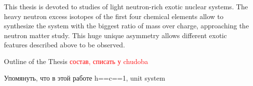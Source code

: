 This thesis is devoted to studies of light neutron-rich exotic nuclear systems.
The heavy neutron excess isotopes of the first four chemical elements allow to synthesize the system with the biggest ratio of mass over charge, approaching the neutron matter study.
This huge unique asymmetry allows different exotic features described above to be observed.

Outline of the Thesis
\textcolor{red}{состав, списать у chudoba}

Упомянуть, что в этой работе h==c==1, unit system











